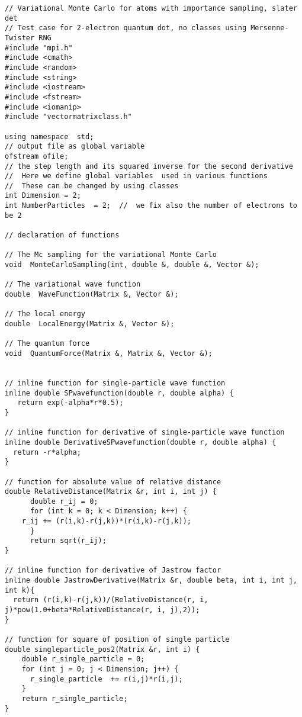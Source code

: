 \begin{verbatim}
// Variational Monte Carlo for atoms with importance sampling, slater det
// Test case for 2-electron quantum dot, no classes using Mersenne-Twister RNG
#include "mpi.h"
#include <cmath>
#include <random>
#include <string>
#include <iostream>
#include <fstream>
#include <iomanip>
#include "vectormatrixclass.h"

using namespace  std;
// output file as global variable
ofstream ofile;  
// the step length and its squared inverse for the second derivative 
//  Here we define global variables  used in various functions
//  These can be changed by using classes
int Dimension = 2; 
int NumberParticles  = 2;  //  we fix also the number of electrons to be 2

// declaration of functions 

// The Mc sampling for the variational Monte Carlo 
void  MonteCarloSampling(int, double &, double &, Vector &);

// The variational wave function
double  WaveFunction(Matrix &, Vector &);

// The local energy 
double  LocalEnergy(Matrix &, Vector &);

// The quantum force
void  QuantumForce(Matrix &, Matrix &, Vector &);


// inline function for single-particle wave function
inline double SPwavefunction(double r, double alpha) { 
   return exp(-alpha*r*0.5);
}

// inline function for derivative of single-particle wave function
inline double DerivativeSPwavefunction(double r, double alpha) { 
  return -r*alpha;
}

// function for absolute value of relative distance
double RelativeDistance(Matrix &r, int i, int j) { 
      double r_ij = 0;  
      for (int k = 0; k < Dimension; k++) { 
	r_ij += (r(i,k)-r(j,k))*(r(i,k)-r(j,k));
      }
      return sqrt(r_ij); 
}

// inline function for derivative of Jastrow factor
inline double JastrowDerivative(Matrix &r, double beta, int i, int j, int k){
  return (r(i,k)-r(j,k))/(RelativeDistance(r, i, j)*pow(1.0+beta*RelativeDistance(r, i, j),2));
}

// function for square of position of single particle
double singleparticle_pos2(Matrix &r, int i) { 
    double r_single_particle = 0;
    for (int j = 0; j < Dimension; j++) { 
      r_single_particle  += r(i,j)*r(i,j);
    }
    return r_single_particle;
}


\end{verbatim}
